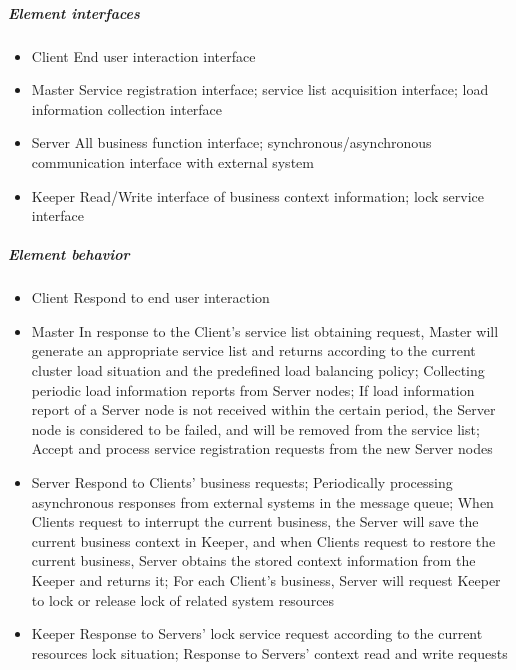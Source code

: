 \documentclass{article}
\begin{document}
			\subparagraph{Element interfaces}
			\begin{itemize}
			\item{Client} End user interaction interface
			\item{Master} Service registration interface; service list acquisition interface; load information collection interface
			\item{Server} All business function interface; synchronous/asynchronous communication interface with external system
			\item{Keeper} Read/Write interface of business context information; lock service interface
			\end{itemize}
			\subparagraph{Element behavior}
			\begin{itemize}
			\item{Client} Respond to end user interaction
			\item{Master} In response to the Client's service list obtaining request, Master will generate an appropriate service list and returns according to the current cluster load situation and the predefined load balancing policy; Collecting periodic load information reports from Server nodes; If load information report of a Server node is not received within the certain period, the Server node is considered to be failed, and will be removed from the service list; Accept and process service registration requests from the new Server nodes			
			\item{Server} Respond to Clients' business requests; Periodically processing asynchronous responses from external systems  in the message queue; When Clients request to interrupt the current business, the Server will save the current business context in Keeper, and when Clients request to restore the current business, Server obtains the stored context information from the Keeper and returns it; For each Client's business, Server will request Keeper to lock or release lock of related system resources 			
			\item{Keeper} Response to Servers' lock service request according to the current resources lock situation; Response to Servers' context read and write requests			
			\end{itemize}
\end{document}

